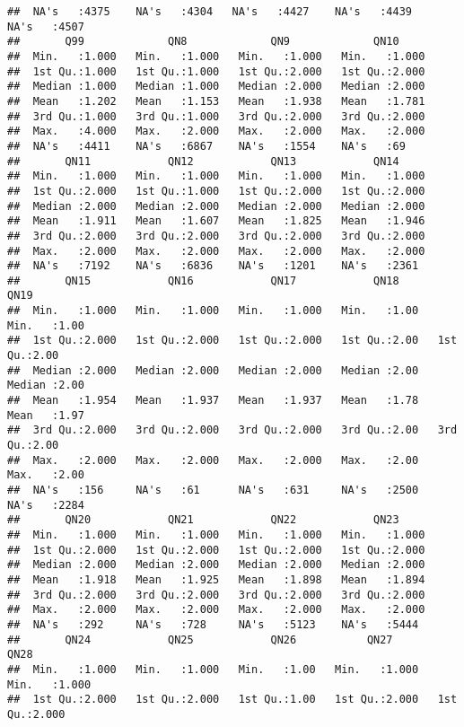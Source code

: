 \documentclass[
]{article}
\begin{document}
\begin{verbatim}
##  NA's   :4375    NA's   :4304   NA's   :4427    NA's   :4439    NA's   :4507   
##       Q99             QN8             QN9             QN10      
##  Min.   :1.000   Min.   :1.000   Min.   :1.000   Min.   :1.000  
##  1st Qu.:1.000   1st Qu.:1.000   1st Qu.:2.000   1st Qu.:2.000  
##  Median :1.000   Median :1.000   Median :2.000   Median :2.000  
##  Mean   :1.202   Mean   :1.153   Mean   :1.938   Mean   :1.781  
##  3rd Qu.:1.000   3rd Qu.:1.000   3rd Qu.:2.000   3rd Qu.:2.000  
##  Max.   :4.000   Max.   :2.000   Max.   :2.000   Max.   :2.000  
##  NA's   :4411    NA's   :6867    NA's   :1554    NA's   :69     
##       QN11            QN12            QN13            QN14      
##  Min.   :1.000   Min.   :1.000   Min.   :1.000   Min.   :1.000  
##  1st Qu.:2.000   1st Qu.:1.000   1st Qu.:2.000   1st Qu.:2.000  
##  Median :2.000   Median :2.000   Median :2.000   Median :2.000  
##  Mean   :1.911   Mean   :1.607   Mean   :1.825   Mean   :1.946  
##  3rd Qu.:2.000   3rd Qu.:2.000   3rd Qu.:2.000   3rd Qu.:2.000  
##  Max.   :2.000   Max.   :2.000   Max.   :2.000   Max.   :2.000  
##  NA's   :7192    NA's   :6836    NA's   :1201    NA's   :2361   
##       QN15            QN16            QN17            QN18           QN19     
##  Min.   :1.000   Min.   :1.000   Min.   :1.000   Min.   :1.00   Min.   :1.00  
##  1st Qu.:2.000   1st Qu.:2.000   1st Qu.:2.000   1st Qu.:2.00   1st Qu.:2.00  
##  Median :2.000   Median :2.000   Median :2.000   Median :2.00   Median :2.00  
##  Mean   :1.954   Mean   :1.937   Mean   :1.937   Mean   :1.78   Mean   :1.97  
##  3rd Qu.:2.000   3rd Qu.:2.000   3rd Qu.:2.000   3rd Qu.:2.00   3rd Qu.:2.00  
##  Max.   :2.000   Max.   :2.000   Max.   :2.000   Max.   :2.00   Max.   :2.00  
##  NA's   :156     NA's   :61      NA's   :631     NA's   :2500   NA's   :2284  
##       QN20            QN21            QN22            QN23      
##  Min.   :1.000   Min.   :1.000   Min.   :1.000   Min.   :1.000  
##  1st Qu.:2.000   1st Qu.:2.000   1st Qu.:2.000   1st Qu.:2.000  
##  Median :2.000   Median :2.000   Median :2.000   Median :2.000  
##  Mean   :1.918   Mean   :1.925   Mean   :1.898   Mean   :1.894  
##  3rd Qu.:2.000   3rd Qu.:2.000   3rd Qu.:2.000   3rd Qu.:2.000  
##  Max.   :2.000   Max.   :2.000   Max.   :2.000   Max.   :2.000  
##  NA's   :292     NA's   :728     NA's   :5123    NA's   :5444   
##       QN24            QN25            QN26           QN27            QN28      
##  Min.   :1.000   Min.   :1.000   Min.   :1.00   Min.   :1.000   Min.   :1.000  
##  1st Qu.:2.000   1st Qu.:2.000   1st Qu.:1.00   1st Qu.:2.000   1st Qu.:2.000  

\end{verbatim}
\end{document}
